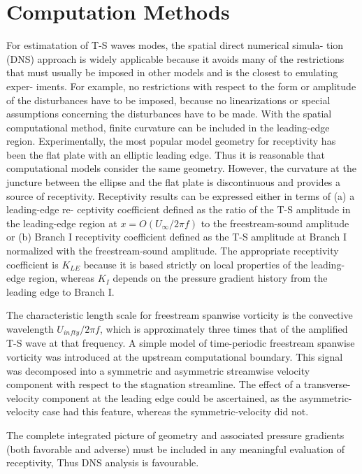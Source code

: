 \documentclass[twoside]{iitbreport}
\begin{document}
\section{Computation Methods}
For estimatation of T-S waves modes, the spatial direct numerical simula-
tion (DNS) approach is widely applicable because it avoids many of the restrictions
that must usually be imposed in other models and is the closest to emulating exper-
iments. For example, no restrictions with respect to the form or amplitude of the
disturbances have to be imposed, because no linearizations or special assumptions
concerning the disturbances have to be made. With the spatial computational method, finite curvature can be included in the
leading-edge region. Experimentally, the most popular model geometry for receptivity has been the
flat plate with an elliptic leading edge. Thus it is reasonable that computational
models consider the same geometry. However, the curvature at the juncture between
the ellipse and the flat plate is discontinuous and provides a source of
receptivity.
Receptivity results can be expressed either in terms of (a) a leading-edge re-
ceptivity coefficient defined as the ratio of the T-S amplitude in the
leading-edge region at $x = O(U_{\infty} /2 \pi f )$ to the freestream-sound amplitude
or (b) Branch I receptivity coefficient defined as the T-S amplitude at Branch I
normalized with the freestream-sound amplitude. The appropriate receptivity
coefficient is $K_{LE}$
because it is based strictly on local properties of the leading-edge region, whereas
$K_I$ depends on the pressure gradient history from the leading edge to
Branch I.

The characteristic length scale for freestream spanwise vorticity is the
convective wavelength $U_{infty} /2 \pi f$, which is approximately three
times that of the amplified T-S wave at that frequency. A
simple model of time-periodic freestream spanwise vorticity was introduced at the
upstream computational boundary. This signal was decomposed into a symmetric
and asymmetric streamwise velocity component with respect to the stagnation
streamline. The effect of a transverse-velocity component at the leading edge
could be ascertained, as the asymmetric-velocity case had this feature, whereas
the symmetric-velocity did not.

The complete integrated picture of geometry and associated pressure
gradients (both favorable and adverse) must be included in any meaningful
evaluation of receptivity, Thus DNS analysis is favourable.
\end{document}
